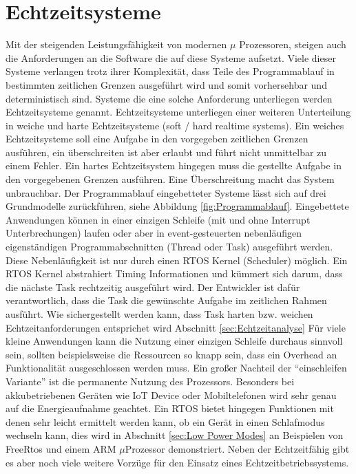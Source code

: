 \documentclass[ngerman]{seminarvorlage}
\begin{document}
\section{Echtzeitsysteme}
Mit der steigenden Leistungsfähigkeit von modernen $\mu$ Prozessoren, steigen auch die Anforderungen an die Software die auf diese Systeme aufsetzt. Viele dieser Systeme verlangen trotz ihrer Komplexität, dass Teile des Programmablauf in bestimmten zeitlichen Grenzen ausgeführt wird und somit vorhersehbar und deterministisch sind. Systeme die eine solche Anforderung unterliegen werden Echtzeitsysteme genannt. Echtzeitsysteme unterliegen einer weiteren Unterteilung in weiche und harte Echtzeitsysteme (soft / hard realtime systems). Ein weiches Echtzeitsysteme soll eine Aufgabe in den vorgegeben zeitlichen Grenzen ausführen, ein überschreiten ist aber erlaubt und führt nicht unmittelbar zu einem Fehler. Ein hartes Echtzeitsystem hingegen muss die gestellte Aufgabe in den vorgegebenen Grenzen ausführen. Eine Überschreitung macht das System unbrauchbar. Der Programmablauf eingebetteter Systeme lässt sich auf drei Grundmodelle zurückführen, siehe Abbildung \ref{fig:Programmablauf}. Eingebettete Anwendungen können in einer einzigen Schleife (mit und ohne Interrupt Unterbrechungen) laufen oder aber in event-gesteuerten nebenläufigen eigenständigen Programmabschnitten (Thread oder Task) ausgeführt werden. Diese Nebenläufigkeit ist nur durch einen RTOS Kernel (Scheduler) möglich. Ein RTOS Kernel abstrahiert Timing Informationen und kümmert sich darum, dass die nächste Task rechtzeitig ausgeführt wird. Der Entwickler ist dafür verantwortlich, dass die Task die gewünschte Aufgabe im zeitlichen Rahmen ausführt. Wie sichergestellt werden kann, dass Task  harten bzw. weichen Echtzeitanforderungen entsprichet wird Abschnitt \ref{sec:Echtzeitanalyse} Für viele kleine Anwendungen kann die Nutzung einer einzigen Schleife durchaus sinnvoll sein, sollten beispielsweise die Ressourcen so knapp sein, dass ein Overhead an Funktionalität ausgeschlossen werden muss. Ein großer Nachteil der "`einschleifen Variante"' ist die permanente Nutzung des Prozessors. Besonders bei akkubetriebenen Geräten wie IoT Device oder Mobiltelefonen wird sehr genau auf die Energieaufnahme geachtet. Ein RTOS bietet hingegen Funktionen mit denen sehr leicht ermittelt werden kann, ob ein Gerät in einen Schlafmodus wechseln kann, dies wird in Abschnitt \ref{sec:Low Power Modes} an Beispielen von FreeRtos und einem ARM $\mu$Prozessor demonstriert. Neben der Echtzeitfähig gibt es aber noch viele weitere Vorzüge für den Einsatz eines Echtzeitbetriebssystems.  
\end{document}
